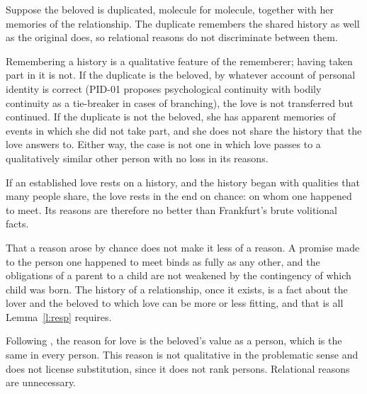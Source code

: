 \documentclass{situationist-preprint}
\begin{document}
\begin{objection}[Duplication]\label{o:dup}
Suppose the beloved is duplicated, molecule for molecule, together with her memories of the relationship. The duplicate remembers the shared history as well as the original does, so relational reasons do not discriminate between them.
\end{objection}

\begin{reply}
Remembering a history is a qualitative feature of the rememberer; having taken part in it is not. If the duplicate is the beloved, by whatever account of personal identity is correct (PID-01 proposes psychological continuity with bodily continuity as a tie-breaker in cases of branching), the love is not transferred but continued. If the duplicate is not the beloved, she has apparent memories of events in which she did not take part, and she does not share the history that the love answers to. Either way, the case is not one in which love passes to a qualitatively similar other person with no loss in its reasons.
\end{reply}

\begin{objection}[Arbitrariness]\label{o:arb}
If an established love rests on a history, and the history began with qualities that many people share, the love rests in the end on chance: on whom one happened to meet. Its reasons are therefore no better than Frankfurt's brute volitional facts.
\end{objection}

\begin{reply}
That a reason arose by chance does not make it less of a reason. A promise made to the person one happened to meet binds as fully as any other, and the obligations of a parent to a child are not weakened by the contingency of which child was born. The history of a relationship, once it exists, is a fact about the lover and the beloved to which love can be more or less fitting, and that is all Lemma~\ref{l:resp} requires.
\end{reply}

\begin{objection}\label{o:vell}
Following \citet{Velleman1999}, the reason for love is the beloved's value as a person, which is the same in every person. This reason is not qualitative in the problematic sense and does not license substitution, since it does not rank persons. Relational reasons are unnecessary.
\end{objection}
\end{document}
